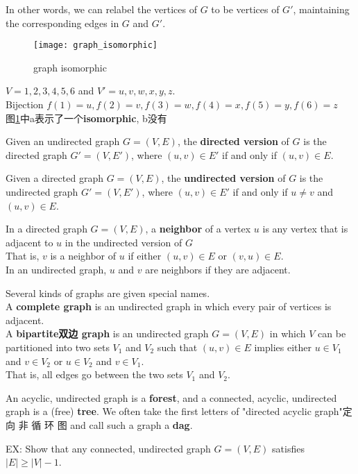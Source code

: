 \documentclass{article}
\begin{document}
In other words, we can relabel the vertices of $G$ to be vertices of $G'$, maintaining the corresponding edges in $G$ and $G'$.

\begin{figure}[htbp]
   \centering
   \texttt{[image: graph\_isomorphic]}\\
   \caption{graph isomorphic}\label{fig.graph.isomorphic}
 \end{figure}

$V = {1, 2, 3, 4, 5, 6}$ and $V' = {u, v, w, x, y, z}$. \\
Bijection $f(1) = u, f(2) = v, f(3) = w, f(4) = x, f(5) = y, f(6) = z$\\
图\ref{fig.graph.isomorphic}中a表示了一个\textbf{isomorphic}, b没有

\bigskip
Given an undirected graph $G = (V, E)$, the \textbf{directed version} of $G$ is the directed graph $G' = (V, E')$, where $(u, v) \in E'$ if and only if $(u, v) \in E$.

Given a directed graph $G = (V, E)$, the \textbf{undirected version} of $G$ is the undirected graph $G'= (V, E')$, where $(u, v) \in E'$ if and only if $u \neq v$ and $(u, v) \in E$.

In a directed graph $G = (V, E)$, a \textbf{neighbor} of a vertex $u$ is any vertex that is adjacent to $u$ in the undirected version of $G$ \\
That is, $v$ is a neighbor of $u$ if either $(u, v) \in E$ or $(v, u) \in E$. \\
In an undirected graph, $u$ and $v$ are neighbors if they are adjacent.

\bigskip
Several kinds of graphs are given special names. \\
A \textbf{complete graph} is an undirected graph in which every pair of vertices is adjacent. \\
A \textbf{bipartite双边 graph} is an undirected graph $G = (V, E)$ in which $V$ can be partitioned into two sets $V_1$ and $V_2$ such that $(u, v) \in E$ implies either $u \in V_1$ and $v \in V_2$ or $u \in V_2$ and $v \in V_1$. \\
That is, all edges go between the two sets $V_1$ and $V_2$.

An acyclic, undirected graph is a \textbf{forest},
and a connected, acyclic, undirected graph is a (free) \textbf{tree}. We often take the first letters of "directed acyclic graph"定向 非 循 环 图 and call such a graph a \textbf{dag}.

EX: Show that any connected, undirected graph $G = (V, E)$ satisfies $|E| \geq |V | - 1$.
\end{document}
